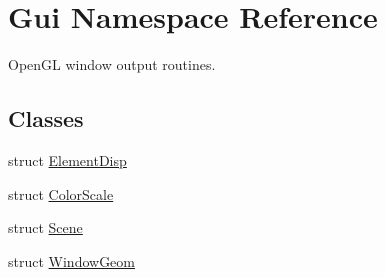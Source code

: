 \hypertarget{namespaceGui}{
\section{Gui Namespace Reference}
\label{namespaceGui}
}
OpenGL window output routines.  


\subsection*{Classes}
\begin{CompactItemize}
\item 
struct \hyperlink{structGui_1_1ElementDisp}{ElementDisp}
\item 
struct \hyperlink{structGui_1_1ColorScale}{ColorScale}
\item 
struct \hyperlink{structGui_1_1Scene}{Scene}
\item 
struct \hyperlink{structGui_1_1WindowGeom}{WindowGeom}
\end{CompactItemize}

